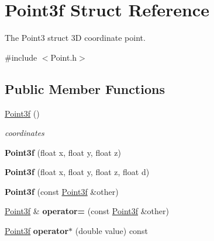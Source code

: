 \hypertarget{struct_point3f}{}\section{Point3f Struct Reference}
\label{struct_point3f}


The Point3 struct 3D coordinate point.  




{\ttfamily \#include $<$Point.\+h$>$}

\subsection*{Public Member Functions}
\begin{DoxyCompactItemize}
\item 
\mbox{\label{struct_point3f_a2231f77480a981cfb2b0a274dd929305}} 
\mbox{\hyperlink{struct_point3f_a2231f77480a981cfb2b0a274dd929305}{Point3f}} ()
\begin{DoxyCompactList}\small\item\em coordinates \end{DoxyCompactList}\item 
\mbox{\label{struct_point3f_ab50836bbe2c4d404ef1fc82610ff327b}} 
{\bfseries Point3f} (float x, float y, float z)
\item 
\mbox{\label{struct_point3f_a869413308c599aa7b86d7ce7c1f72e9f}} 
{\bfseries Point3f} (float x, float y, float z, float d)
\item 
\mbox{\label{struct_point3f_a696c86a9b57a53c939f937d4378e05ab}} 
{\bfseries Point3f} (const \mbox{\hyperlink{struct_point3f}{Point3f}} \&other)
\item 
\mbox{\label{struct_point3f_a6d35bbcaec9edaa3f018fd44556bb8dc}} 
\mbox{\hyperlink{struct_point3f}{Point3f}} \& {\bfseries operator=} (const \mbox{\hyperlink{struct_point3f}{Point3f}} \&other)
\item 
\mbox{\label{struct_point3f_a9c08cd8213970030f6bd22607d6749ed}} 
\mbox{\hyperlink{struct_point3f}{Point3f}} {\bfseries operator$\ast$} (double value) const
\item 
\mbox{\label{struct_point3f_af8824ee316210610951c6233eccd8018}} 

\end{DoxyCompactItemize}
